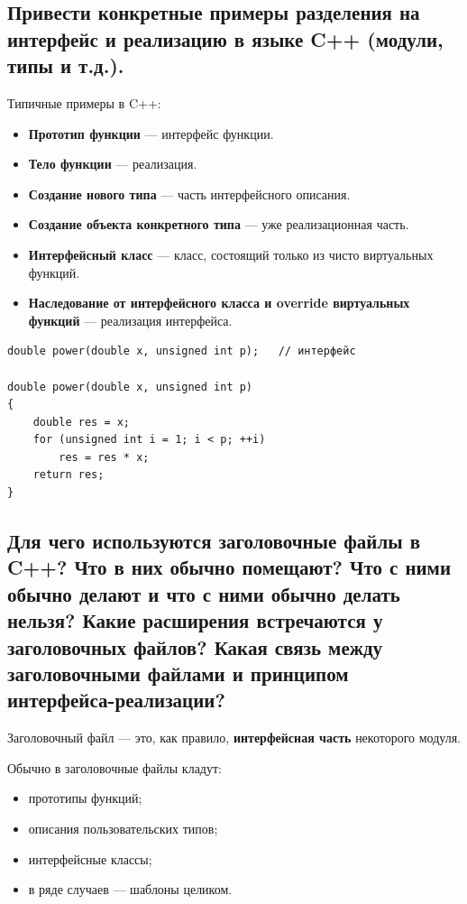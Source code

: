 \subsection{Привести конкретные примеры разделения на интерфейс и реализацию в языке C++ (модули, типы и т.д.).}

Типичные примеры в C++:

\begin{itemize}
    \item \textbf{Прототип функции} --- интерфейс функции.
    \item \textbf{Тело функции} --- реализация.
    \item \textbf{Создание нового типа} --- часть интерфейсного описания.
    \item \textbf{Создание объекта конкретного типа} --- уже реализационная часть.
    \item \textbf{Интерфейсный класс} --- класс, состоящий только из чисто виртуальных функций.
    \item \textbf{Наследование от интерфейсного класса и override виртуальных функций} --- реализация интерфейса.
\end{itemize}

\begin{example}
\begin{verbatim}
double power(double x, unsigned int p);   // интерфейс

double power(double x, unsigned int p)
{
    double res = x;
    for (unsigned int i = 1; i < p; ++i)
        res = res * x;
    return res;
}
\end{verbatim}
\end{example}


\subsection{Для чего используются заголовочные файлы в C++? Что в них обычно помещают? Что с ними обычно делают и что с ними обычно делать нельзя? Какие расширения встречаются у заголовочных файлов? Какая связь между заголовочными файлами и принципом интерфейса-реализации?}

\begin{definition}
Заголовочный файл --- это, как правило, \textbf{интерфейсная часть} некоторого модуля.
\end{definition}

Обычно в заголовочные файлы кладут:
\begin{itemize}
    \item прототипы функций;
    \item описания пользовательских типов;
    \item интерфейсные классы;
    \item в ряде случаев --- шаблоны целиком.
\end{itemize}

